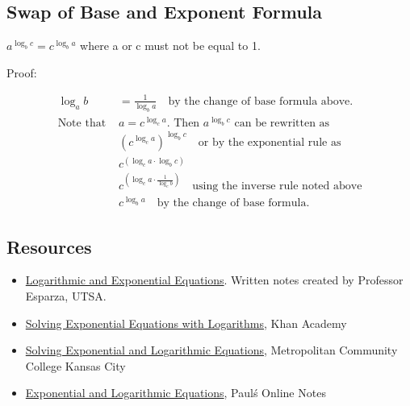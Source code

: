 \subsection{Swap of Base and Exponent Formula}
\label{sss:swap-aeed}




$a^{\log _{b}c}=c^{\log _{b}a}$ where a or c must not be equal to 1.



Proof:



\begin{align} \log _{a}b &= \frac{1}{\log _{b}a} \quad \text{by the change of base formula above.} \\ \text{Note that } & a = c^{\log _{c}a}. \text{ Then } a^{\log _{b}c} \text{ can be rewritten as} \\ & \left(c^{\log _{c}a}\right)^{\log _{b}c} \quad \text{or by the exponential rule as} \\ & c^{\left(\log _{c}a \cdot \log _{b}c\right)} \\ & c^{\left(\log _{c}a \cdot \frac{1}{\log _{c}b}\right)} \quad \text{using the inverse rule noted above} \\ & c^{\log _{b}a} \quad \text{by the change of base formula.} \end{align}




\subsection{Resources}
\label{sss:reso-55b5}




\begin{itemize}
    \item \href{https://mathresearch.utsa.edu/wikiFiles/MAT1093/Logarithmic\%20and\%20Exponential\%20Equations/Esparza\%201093\%20Notes\%207.4.pdf}{Logarithmic and Exponential Equations}. Written notes created by Professor Esparza, UTSA.
    \item \href{https://www.khanacademy.org/math/algebra2/x2ec2f6f830c9fb89:logs/x2ec2f6f830c9fb89:exp-eq-log/a/solving-exponential-equations-with-logarithms}{Solving Exponential Equations with Logarithms}, Khan Academy
    \item \href{https://www.mcckc.edu/tutoring/docs/br/math/expon_logar/Solving_Exponential_and_Logarithmic_Equations.pdf}{Solving Exponential and Logarithmic Equations}, Metropolitan Community College Kansas City
    \item \href{https://tutorial.math.lamar.edu/classes/calci/explogeqns.aspx}{Exponential and Logarithmic Equations}, Paul\'s Online Notes
\end{itemize}



